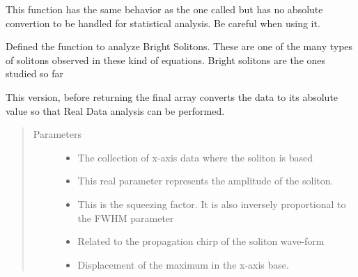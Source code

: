 \documentclass[letterpaper,10pt,english]{sphinxmanual}
\begin{document}
\begin{fulllineitems}
\begin{quote}
\begin{description}
\end{description}\end{quote}

\begin{fulllineitems}
\label{\detokenize{index:Loader.meshPlot.dissSech}}
This function has the same behavior as the one called  but has no absolute
convertion to be handled for statistical analysis.
Be careful when using it.

\end{fulllineitems}


\begin{fulllineitems}
\label{\detokenize{index:Loader.meshPlot.dissSechAbs}}
Defined the function to analyze Bright Solitons. These are one of the many types of
solitons observed in these kind of equations. Bright solitons are the ones studied so far

This version, before returning the final array converts the data to its absolute value so that Real Data analysis can be performed.
\begin{quote}\begin{description}
\item[{Parameters}] \leavevmode\begin{itemize}
\item {} 
 \textendash{} The collection of x-axis data where the soliton is based

\item {} 
 \textendash{} This real parameter represents the amplitude of the soliton.

\item {} 
 \textendash{} This is the squeezing factor. It is also inversely proportional to the FWHM parameter

\item {} 
 \textendash{} Related to the propagation chirp of the soliton wave-form

\item {} 
 \textendash{} Displacement of the maximum in the x-axis base.


\end{itemize}
\end{description}
\end{quote}
\end{fulllineitems}
\end{fulllineitems}
\end{document}
